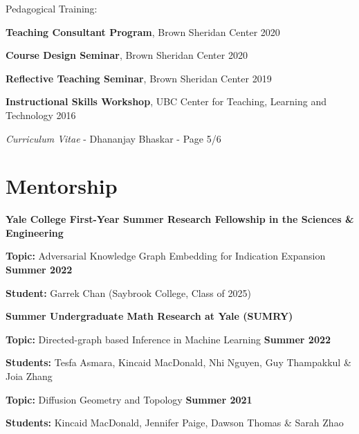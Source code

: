 \documentclass[margin,line]{res}
\newenvironment{list1}{
  \begin{list}{\ding{113}}{
      \setlength{\itemsep}{0in}
      \setlength{\parsep}{0in} \setlength{\parskip}{0in}
      \setlength{\topsep}{0in} \setlength{\partopsep}{0in}
      \setlength{\leftmargin}{0.17in}}}{\end{list}}
\begin{document}
\begin{resume}
Pedagogical Training:
\vspace*{.2cm}

\begin{list1}
\setlength\itemsep{0.25em}
\item[] {\bf Teaching Consultant Program}, Brown Sheridan Center \hfill 2020
\item[] {\bf Course Design Seminar}, Brown Sheridan Center \hfill 2020
\item[] {\bf Reflective Teaching Seminar}, Brown Sheridan Center \hfill 2019
\item[] {\bf Instructional Skills Workshop}, UBC Center for Teaching, Learning and Technology \hfill 2016
\end{list1} 

\newpage
\begin{flushright}
\textit{Curriculum Vitae} - Dhananjay Bhaskar - Page 5/6
\end{flushright}
\vspace*{.1cm}

\section{\sc Mentorship}

{\bf Yale College First-Year Summer Research Fellowship in the Sciences \& Engineering}
\vspace*{.2cm}
\begin{list1}
\setlength\itemsep{0.2em}
\item[] {\bf Topic:} Adversarial Knowledge Graph Embedding for Indication Expansion \hfill {\bf Summer 2022}
\item[] {\bf Student:} Garrek Chan (Saybrook College, Class of 2025) 
\end{list1}

{\bf Summer Undergraduate Math Research at Yale (SUMRY)}
\vspace*{.2cm}
\begin{list1}
\setlength\itemsep{0.2em}
\item[] {\bf Topic:} Directed-graph based Inference in Machine Learning \hfill {\bf Summer 2022}
\item[] {\bf Students:} Tesfa Asmara, Kincaid MacDonald, Nhi Nguyen, Guy Thampakkul \& Joia Zhang 
\end{list1}
\vspace*{.2cm}
\begin{list1}
\setlength\itemsep{0.2em}
\item[] {\bf Topic:} Diffusion Geometry and Topology \hfill {\bf Summer 2021}
\item[] {\bf Students:} Kincaid MacDonald, Jennifer Paige, Dawson Thomas \& Sarah Zhao
\end{list1}


\end{resume}
\end{document}
